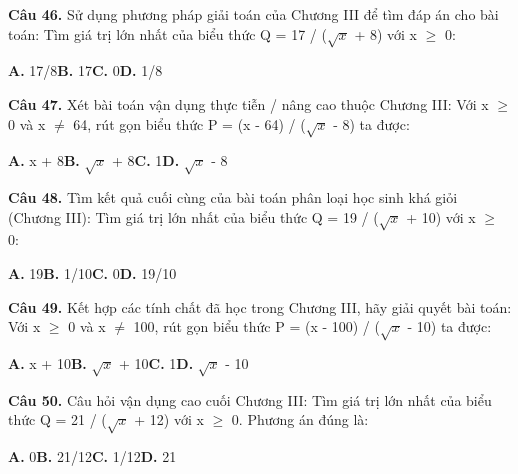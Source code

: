 \documentclass[11pt,a4paper]{article}
\begin{document}
\textbf{\color{primary} Câu 46.} Sử dụng phương pháp giải toán của Chương III để tìm đáp án cho bài toán: Tìm giá trị lớn nhất của biểu thức Q = 17 / ($\sqrt{x}$ + 8) với x $\ge$ 0:\par
\hspace*{1.5em}\textbf{A.} 17/8\quad\quad \textbf{B.} 17\quad\quad \textbf{C.} 0\quad\quad \textbf{D.} 1/8\par\vspace{2pt}
\textbf{\color{primary} Câu 47.} Xét bài toán vận dụng thực tiễn / nâng cao thuộc Chương III: Với x $\ge$ 0 và x $\ne$ 64, rút gọn biểu thức P = (x - 64) / ($\sqrt{x}$ - 8) ta được:\par
\hspace*{1.5em}\textbf{A.} x + 8\quad\quad \textbf{B.} $\sqrt{x}$ + 8\quad\quad \textbf{C.} 1\quad\quad \textbf{D.} $\sqrt{x}$ - 8\par\vspace{2pt}
\textbf{\color{primary} Câu 48.} Tìm kết quả cuối cùng của bài toán phân loại học sinh khá giỏi (Chương III): Tìm giá trị lớn nhất của biểu thức Q = 19 / ($\sqrt{x}$ + 10) với x $\ge$ 0:\par
\hspace*{1.5em}\textbf{A.} 19\quad\quad \textbf{B.} 1/10\quad\quad \textbf{C.} 0\quad\quad \textbf{D.} 19/10\par\vspace{2pt}
\textbf{\color{primary} Câu 49.} Kết hợp các tính chất đã học trong Chương III, hãy giải quyết bài toán: Với x $\ge$ 0 và x $\ne$ 100, rút gọn biểu thức P = (x - 100) / ($\sqrt{x}$ - 10) ta được:\par
\hspace*{1.5em}\textbf{A.} x + 10\quad\quad \textbf{B.} $\sqrt{x}$ + 10\quad\quad \textbf{C.} 1\quad\quad \textbf{D.} $\sqrt{x}$ - 10\par\vspace{2pt}
\textbf{\color{primary} Câu 50.} Câu hỏi vận dụng cao cuối Chương III: Tìm giá trị lớn nhất của biểu thức Q = 21 / ($\sqrt{x}$ + 12) với x $\ge$ 0. Phương án đúng là:\par
\hspace*{1.5em}\textbf{A.} 0\quad\quad \textbf{B.} 21/12\quad\quad \textbf{C.} 1/12\quad\quad \textbf{D.} 21\par\vspace{2pt}
\end{document}
